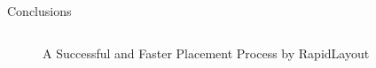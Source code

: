 \documentclass[10pt]{beamer}
\begin{document}
\begin{frame}{Conclusions}
\begin{columns}[T, onlytextwidth]

    \begin{figure}[h]
      \centering
      \caption{
       A Successful and Faster Placement Process by RapidLayout
      }
      \label{fig:overview}
    \end{figure}


  \end{columns}

\end{frame}
\end{document}
